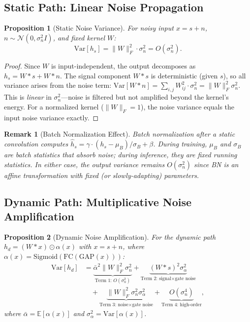 \documentclass[journal]{IEEEtran}
\newtheorem{proposition}{Proposition}
\newtheorem{remark}{Remark}
\begin{document}
\subsection{Static Path: Linear Noise Propagation}

\begin{proposition}[Static Noise Variance]
\label{prop:static}
For noisy input $x = s + n$, $n \sim \mathcal{N}(0, \sigma_n^2 I)$, and fixed kernel $W$:
\begin{equation}
\text{Var}[h_s] = \|W\|_F^2 \cdot \sigma_n^2 = O(\sigma_n^2).
\end{equation}
\end{proposition}

\begin{proof}
Since $W$ is input-independent, the output decomposes as $h_s = W * s + W * n$.
The signal component $W * s$ is deterministic (given $s$), so all variance arises from the noise term:
$\text{Var}[W * n] = \sum_{i,j} W_{ij}^2 \cdot \sigma_n^2 = \|W\|_F^2 \sigma_n^2$.
This is \emph{linear} in $\sigma_n^2$---noise is filtered but not amplified beyond the kernel's energy.
For a normalized kernel ($\|W\|_F = 1$), the noise variance equals the input noise variance exactly.
\end{proof}

\begin{remark}[Batch Normalization Effect]
\label{rem:bn}
Batch normalization after a static convolution computes $\hat{h}_s = \gamma \cdot (h_s - \mu_B) / \sigma_B + \beta$.
During training, $\mu_B$ and $\sigma_B$ are batch statistics that absorb noise; during inference, they are fixed running statistics.
In either case, the output variance remains $O(\sigma_n^2)$ since BN is an affine transformation with fixed (or slowly-adapting) parameters.
\end{remark}

\subsection{Dynamic Path: Multiplicative Noise Amplification}

\begin{proposition}[Dynamic Noise Amplification]
\label{prop:dynamic}
For the dynamic path $h_d = (W * x) \odot \alpha(x)$ with $x = s + n$, where $\alpha(x) = \text{Sigmoid}(\text{FC}(\text{GAP}(x)))$:
\begin{align}
\text{Var}[h_d] &= \underbrace{\bar{\alpha}^2 \|W\|_F^2 \sigma_n^2}_{\text{Term 1: } O(\sigma_n^2)} + \underbrace{(W*s)^2 \sigma_\alpha^2}_{\text{Term 2: signal$\times$gate noise}} \nonumber \\
&\quad + \underbrace{\|W\|_F^2 \sigma_n^2 \sigma_\alpha^2}_{\text{Term 3: noise$\times$gate noise}} + \underbrace{O(\sigma_n^4)}_{\text{Term 4: high-order}},
\label{eq:dynamic_var}
\end{align}
where $\bar{\alpha} = \mathbb{E}[\alpha(x)]$ and $\sigma_\alpha^2 = \text{Var}[\alpha(x)]$.
\end{proposition}
\end{document}
